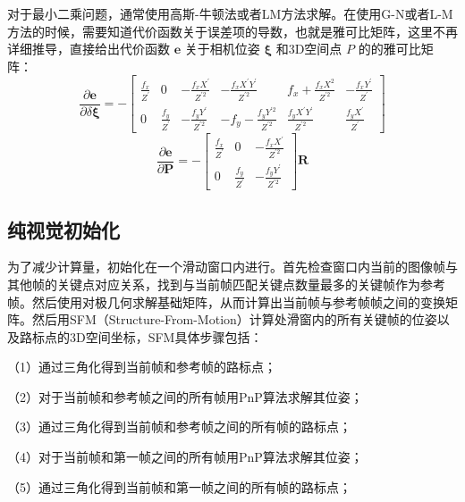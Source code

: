 对于最小二乘问题，通常使用高斯-牛顿法或者LM方法求解。在使用G-N或者L-M方法的时候，需要知道代价函数关于误差项的导数，也就是雅可比矩阵，这里不再详细推导，直接给出代价函数 $\boldsymbol{e} $ 关于相机位姿 $\boldsymbol{\xi} $ 和3D空间点 $P$ 的的雅可比矩阵：
\begin{equation}
\label{eqn:3.81}
\frac{\partial \bm{e}}{\partial \delta \bm{\xi}} = 
-\left[ \begin{array}{cccccc}
{\frac{f_{x}}{Z^{\prime}}} & {0} & {-\frac{f_{x} X^{\prime}}{Z^{\prime 2}}} &
{-\frac{f_{x} X^{\prime} Y^{\prime}}{Z^{\prime 2}}} & {f_{x}+\frac{f_{x} X^{2}}{Z^{\prime 2}}} & {-\frac{f_{x} Y^{\prime}}{Z^{\prime}}}  \\ 
{0} & {\frac{f_{y}}{Z^{\prime}}} & {-\frac{f_{y} Y^{\prime}}{Z^{\prime 2}}} &
{-f_{y}-\frac{f_{y} Y^{\prime 2}}{Z^{\prime 2}}} & {\frac{f_{y} X^{\prime} Y^{\prime}}{Z^{\prime 2}}} & {\frac{f_{y} X^{\prime}}{Z^{\prime}}} 
\end{array}\right]
\end{equation}
\begin{equation}
\label{eqn:3.82}
\frac{\partial \bm{e}}{\partial \boldsymbol{P}}=-\left[ \begin{array}{ccc}{\frac{f_{x}}{Z^{\prime}}} & {0} & {-\frac{f_{x} X^{\prime}}{Z^{\prime 2}}} \\ {0} & {\frac{f_{y}}{Z^{\prime}}} & {-\frac{f_{y} Y^{\prime}}{Z^{\prime 2}}}\end{array}\right] \boldsymbol{R}
\end{equation}
\subsection{纯视觉初始化}
为了减少计算量，初始化在一个滑动窗口内进行。首先检查窗口内当前的图像帧与其他帧的关键点对应关系，找到与当前帧匹配关键点数量最多的关键帧作为参考帧。然后使用对极几何求解基础矩阵，从而计算出当前帧与参考帧帧之间的变换矩阵。然后用SFM（Structure-From-Motion）计算处滑窗内的所有关键帧的位姿以及路标点的3D空间坐标，SFM具体步骤包括：

（1）通过三角化得到当前帧和参考帧的路标点；

（2）对于当前帧和参考帧之间的所有帧用PnP算法求解其位姿；

（3）通过三角化得到当前帧和参考帧之间的所有帧的路标点；

（4）对于当前帧和第一帧之间的所有帧用PnP算法求解其位姿；

（5）通过三角化得到当前帧和第一帧之间的所有帧的路标点；

